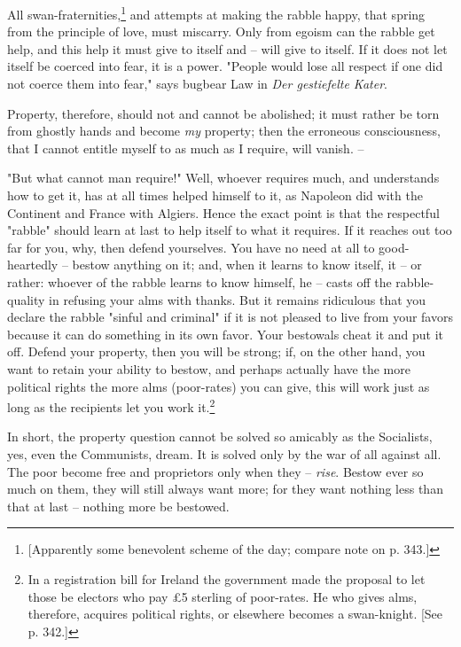 All swan-fraternities,\footnote{[Apparently some benevolent scheme of the day; 
compare note on p. 343.]} and attempts at making the rabble happy, that spring 
from the principle of love, must miscarry. Only from egoism can the rabble get 
help, and this help it must give to itself and -- will give to itself. If it 
does not let itself be coerced into fear, it is a power. "{}People would lose 
all respect if one did not coerce them into fear,"{} says bugbear Law in 
\textit{Der gestiefelte Kater}.

Property, therefore, should not and cannot be abolished; it must rather be 
torn from ghostly hands and become \textit{my} property; then the erroneous 
consciousness, that I cannot entitle myself to as much as I require, will 
vanish. --

"{}But what cannot man require!"{} Well, whoever requires much, and 
understands how to get it, has at all times helped himself to it, as Napoleon 
did with the Continent and France with Algiers. Hence the exact point is that 
the respectful "{}rabble"{} should learn at last to help itself to what it 
requires. If it reaches out too far for you, why, then defend yourselves. You 
have no need at all to good-heartedly -- bestow anything on it; and, when it 
learns to know itself, it -- or rather: whoever of the rabble learns to know 
himself, he -- casts off the rabble-quality in refusing your alms with thanks. 
But it remains ridiculous that you declare the rabble "{}sinful and 
criminal"{} if it is not pleased to live from your favors because it can do 
something in its own favor. Your bestowals cheat it and put it off. Defend 
your property, then you will be strong; if, on the other hand, you want to 
retain your ability to bestow, and perhaps actually have the more political 
rights the more alms (poor-rates) you can give, this will work just as long as 
the recipients let you work it.\footnote{In a registration bill for Ireland 
the government made the proposal to let those be electors who pay \pounds{}5 
sterling of poor-rates. He who gives alms, therefore, acquires political 
rights, or elsewhere becomes a swan-knight. [See p. 342.]}

In short, the property question cannot be solved so amicably as the 
Socialists, yes, even the Communists, dream. It is solved only by the war of 
all against all. The poor become free and proprietors only when they -- 
\textit{rise}. Bestow ever so much on them, they will still always want more; 
for they want nothing less than that at last -- nothing more be bestowed.

